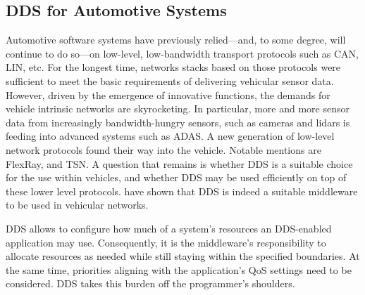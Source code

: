 \subsection{DDS for Automotive Systems}
Automotive software systems have previously relied---and, to some degree, will continue to do so---on low-level, low-bandwidth transport protocols such as CAN, LIN, etc. For the longest time, networks stacks based on those protocols were sufficient to meet the basic requirements of delivering vehicular sensor data. However, driven by the emergence of innovative functions, the demands for vehicle intrinsic networks are skyrocketing. In particular, more and more sensor data from increasingly bandwidth-hungry sensors, such as cameras and lidars is feeding into advanced systems such as ADAS. 
A new generation of low-level network protocols found their way into the vehicle. Notable mentions are FlexRay, and TSN. A question that remains is whether DDS is a suitable choice for the use within vehicles, and whether DDS may be used efficiently on top of these lower level protocols. \citeauthor*{bouhouch2013dds} have shown \cite{bouhouch2013dds} that DDS is indeed a suitable middleware to be used in vehicular networks.

DDS allows to configure how much of a system's resources an DDS-enabled application may use. Consequently, it is the middleware's responsibility to allocate resources as needed while still staying within the specified boundaries. At the same time, priorities aligning with the application's QoS settings need to be considered. DDS takes this burden off the programmer's shoulders.


%
%
%
%
%
%
%
%
%
%
%
%
%
%
%
%
%
%
%
%